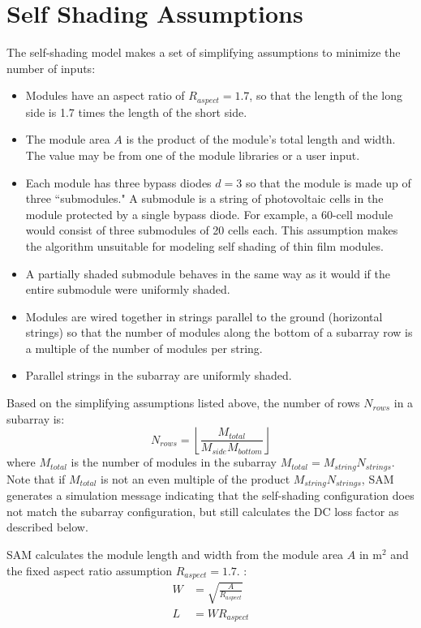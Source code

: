 \documentclass[12pt,letterpaper]{article}
\begin{document}
\section{Self Shading Assumptions}\label{sec-selfshadgeom}

The self-shading model makes a set of simplifying assumptions to minimize the number of inputs:

\begin{itemize}
\item Modules have an aspect ratio of $R_{aspect}=1.7$, so that the length of the long side is 1.7 times the length of the short side. 
\item The module area $A$ is the product of the module's total length and width. The value may be from one of the module libraries or a user input.
\item Each module has three bypass diodes $d=3$ so that the module is made up of three ``submodules." A submodule is a string of photovoltaic cells in the module protected by a single bypass diode. For example, a 60-cell module would consist of three submodules of 20 cells each. This assumption makes the algorithm unsuitable for modeling self shading of thin film modules.
\item A partially shaded submodule behaves in the same way as it would if the entire submodule were uniformly shaded.
\item Modules are wired together in strings parallel to the ground (horizontal strings) so that the number of modules along the bottom of a subarray row is a multiple of the number of modules per string.
\item Parallel strings in the subarray are uniformly shaded.
\end{itemize}

Based on the simplifying assumptions listed above, the number of rows $N_{rows}$ in a subarray is:
\begin{equation}
N_{rows} = \left\lfloor \frac{M_{total}}{M_{side} M_{bottom}} \right\rfloor
\end{equation}
where $M_{total}$ is the number of modules in the subarray $M_{total}=M_{string}N_{strings}$. Note that if $M_{total}$ is not an even multiple of the product $M_{string}N_{strings}$, SAM generates a simulation message indicating that the self-shading configuration does not match the subarray configuration, but still calculates the DC loss factor as described below.

SAM calculates the module length and width from the module area $A$ in $\text{m}^2$  and the fixed aspect ratio assumption  $R_{aspect}=1.7$. :
\begin{align}
W &= \sqrt{ \frac{A}{R_{aspect}}}\\
L &= W \mathit{R_{aspect}}
\end{align}
\end{document}
